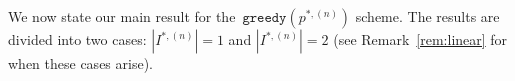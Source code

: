 \documentclass[a4paper]{article}
\theoremstyle{plain}
\theoremstyle{definition}
\theoremstyle{case}
\theoremstyle{remark}
\begin{document}

We now state our main result for the~$\texttt{greedy}(p^{*,(n)})$ scheme.
The results are divided into two cases: $|I^{*,(n)}|=1$ and $|I^{*,(n)}|=2$ (see Remark~\ref{rem:linear} for when these cases arise). 



\end{document}

